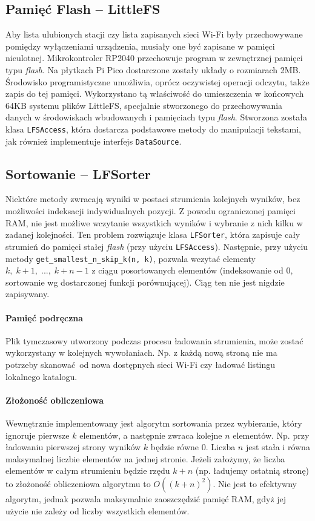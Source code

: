 \documentclass[12pt]{report}
\begin{document}
		\subsection{Pamięć Flash -- LittleFS}
			Aby lista ulubionych stacji czy lista zapisanych sieci Wi-Fi były przechowywane pomiędzy wyłączeniami urządzenia, musiały one być zapisane w pamięci nieulotnej. Mikrokontroler RP2040 przechowuje program w zewnętrznej pamięci typu \textit{flash}. Na płytkach Pi Pico dostarczone zostały układy o rozmiarach 2MB. Środowisko programistyczne umożliwia, oprócz oczywistej operacji odczytu, także zapis do tej pamięci. Wykorzystano tą właściwość do umieszczenia w końcowych 64KB systemu plików LittleFS\textsuperscript{\cite{littlefs}}, specjalnie stworzonego do przechowywania danych w środowiskach wbudowanych i pamięciach typu \textit{flash}. Stworzona została klasa \lstinline|LFSAccess|, która dostarcza podstawowe metody do manipulacji tekstami, jak również implementuje interfejs \lstinline|DataSource|.
			
		\subsection{Sortowanie -- LFSorter}
			Niektóre metody zwracają wyniki w postaci strumienia kolejnych wyników, bez możliwości indeksacji indywidualnych pozycji. Z powodu ograniczonej pamięci RAM, nie jest możliwe wczytanie wszystkich wyników i wybranie z nich kilku w zadanej kolejności. Ten problem rozwiązuje klasa \lstinline|LFSorter|, która zapisuje cały strumień do pamięci stałej \textit{flash} (przy użyciu \lstinline|LFSAccess|). Następnie, przy użyciu metody \lstinline|get_smallest_n_skip_k(n, k)|, pozwala wczytać elementy $k,\; k+1,\; ...,\; k+n-1$ z ciągu posortowanych elementów (indeksowanie od 0, sortowanie wg dostarczonej funkcji porównującej). Ciąg ten nie jest nigdzie zapisywany.
			
			\paragraph{Pamięć podręczna}
			Plik tymczasowy utworzony podczas procesu ładowania strumienia, może zostać wykorzystany w kolejnych wywołaniach. Np. z każdą nową stroną nie ma potrzeby skanować od nowa dostępnych sieci Wi-Fi czy ładować listingu lokalnego katalogu.
						
			\paragraph{Złożoność obliczeniowa}
			Wewnętrznie implementowany jest algorytm sortowania przez wybieranie, który ignoruje pierwsze $k$ elementów, a następnie zwraca kolejne $n$ elementów. Np. przy ładowaniu pierwszej strony wyników $k$ będzie równe 0. Liczba $n$ jest stała i równa maksymalnej liczbie elementów na jednej stronie. Jeżeli założymy, że liczba elementów w całym strumieniu będzie rzędu $k+n$ (np. ładujemy ostatnią stronę) to złożoność obliczeniowa algorytmu to $O((k+n)^2)$. Nie jest to efektywny algorytm, jednak pozwala maksymalnie zaoszczędzić pamięć RAM, gdyż jej użycie nie zależy od liczby wszystkich elementów.
			
\end{document}
